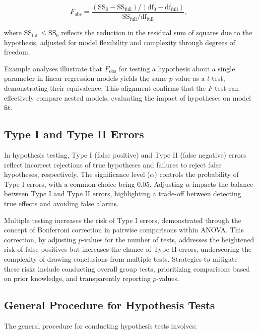 \documentclass{article}
\begin{document}
\begin{equation*}
F_{\mathrm{obs}} = \frac{(\mathrm{SS}_{0} - \mathrm{SS}_{\mathrm{full}}) /(\mathrm{df}_{0} - \mathrm{df}_{\mathrm{full}})}{\mathrm{SS}_{\mathrm{full}} / \mathrm{df}_{\mathrm{full}}},
\end{equation*}

where $\mathrm{SS}_{\text{full}} \leq \mathrm{SS}_{0}$ reflects the reduction in the residual sum of squares due to the hypothesis, adjusted for model flexibility and complexity through degrees of freedom.

Example analyses illustrate that $F_{\text{obs}}$ for testing a hypothesis about a single parameter in linear regression models yields the same $p$-value as a $t$-test, demonstrating their equivalence. This alignment confirms that the $F$-test can effectively compare nested models, evaluating the impact of hypotheses on model fit.

\subsection{Type I and Type II Errors}

In hypothesis testing, Type I (false positive) and Type II (false negative) errors reflect incorrect rejections of true hypotheses and failures to reject false hypotheses, respectively. The significance level ($\alpha$) controls the probability of Type I errors, with a common choice being $0.05$. Adjusting $\alpha$ impacts the balance between Type I and Type II errors, highlighting a trade-off between detecting true effects and avoiding false alarms.

Multiple testing increases the risk of Type I errors, demonstrated through the concept of Bonferroni correction in pairwise comparisons within ANOVA. This correction, by adjusting $p$-values for the number of tests, addresses the heightened risk of false positives but increases the chance of Type II errors, underscoring the complexity of drawing conclusions from multiple tests. Strategies to mitigate these risks include conducting overall group tests, prioritizing comparisons based on prior knowledge, and transparently reporting $p$-values.

\subsection*{General Procedure for Hypothesis Tests}

The general procedure for conducting hypothesis tests involves:
\end{document}
